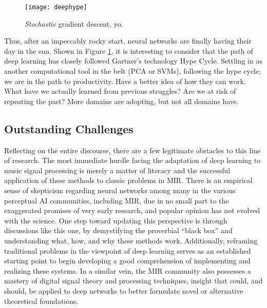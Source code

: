 \begin{figure}
\begin{centering}
\texttt{[image: deephype]}
\caption{\emph{Stochastic} gradient descent, yo.}
\label{fig:deephype}
\end{centering}
\end{figure}

Thus, after an impeccably rocky start, neural networks are finally having their day in the sun.
Shown in Figure \ref{fig:deephype}, it is interesting to consider that the path of deep learning has closely followed Gartner's technology Hype Cycle.
Settling in as another computational tool in the belt (PCA or SVMs), following the hype cycle; we are in the path to productivity.
Have a better idea of how they can work.
What have we actually learned from previous struggles? Are we at risk of repeating the past?
More domains are adopting, but not all domains have.

\subsection{Outstanding Challenges}

Reflecting on the entire discourse, there are a few legitimate obstacles to this line of research.
The most immediate hurdle facing the adaptation of deep learning to music signal processing is merely a matter of literacy and the successful application of these methods to classic problems in MIR.
There is an empirical sense of skepticism regarding neural networks among many in the various perceptual AI communities, including MIR, due in no small part to the exaggerated promises of very early research, and popular opinion has not evolved with the science.
One step toward updating this perspective is through discussions like this one, by demystifying the proverbial ``black box'' and understanding what, how, and why these methods work.
Additionally, reframing traditional problems in the viewpoint of deep learning serves as an established starting point to begin developing a good comprehension of implementing and realizing these systems.
In a similar vein, the MIR community also possesses a mastery of digital signal theory and processing techniques, insight that could, and should, be applied to deep networks to better formulate novel or alternative theoretical foundations.

